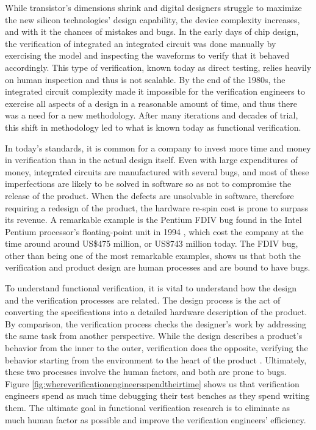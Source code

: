 \par While transistor's dimensions shrink and digital designers struggle to
maximize the new silicon technologies' design capability, the device complexity
increases, and with it the chances of mistakes and bugs. In the early days of
chip design, the verification of integrated an integrated circuit was done
manually by exercising the model and inspecting the waveforms to verify that it
behaved accordingly. This type of verification, known today as direct testing,
relies heavily on human inspection and thus is not scalable. By the end of the
1980s, the integrated circuit complexity made it impossible for the verification
engineers to exercise all aspects of a design in a reasonable amount of time,
and thus there was a need for a new methodology. After many iterations and
decades of trial, this shift in methodology led to what is known today as
functional verification.

\par In today's standards, it is common for a company to invest more time and
money in verification than in the actual design itself. Even with large
expenditures of money, integrated circuits are manufactured with several bugs,
and most of these imperfections are likely to be solved in software so as not to
compromise the release of the product. When the defects are unsolvable in
software, therefore requiring a redesign of the product, the hardware re-spin
cost is prone to surpass its revenue. A remarkable example is the Pentium FDIV
bug found in the Intel Pentium processor's floating-point unit in 1994
\cite{online:intelfvd}, which cost the company at the time around around US\$475
million, or US\$743 million today. The FDIV bug, other than being one of the
most remarkable examples, shows us that both the verification and product design
are human processes and are bound to have bugs.


\par To understand functional verification, it is vital to understand how the
design and the verification processes are related. The design process is the act
of converting the specifications into a detailed hardware description of the
product. By comparison, the verification process checks the designer's work by
addressing the same task from another perspective. While the design describes a
product's behavior from the inner to the outer, verification does the opposite,
verifying the behavior starting from the environment to the heart of the product
\cite{keating2011simple}. Ultimately, these two processes involve the human
factors, and both are prone to bugs. Figure
\ref{fig:whereverificationengineersspendtheirtime} shows us that verification
engineers spend as much time debugging their test benches as they spend writing
them. The ultimate goal in functional verification research is to eliminate as
much human factor as possible and improve the verification engineers'
efficiency.

